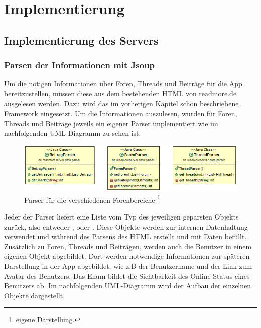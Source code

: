 \chapter{Implementierung}

\section{Implementierung des Servers}
\subsection{Parsen der Informationen mit Jsoup}
Um die nötigen Informationen über Foren, Threads und Beiträge für die App
bereitzustellen, müssen diese aus dem bestehenden HTML von readmore.de
ausgelesen werden. Dazu wird das im vorherigen Kapitel schon beschriebene
Framework  eingesetzt. Um die Informationen auszulesen,
wurden für Foren, Threads und Beiträge jeweils ein eigener Parser implementiert
wie im nachfolgenden UML-Diagramm zu sehen ist.
\begin{figure}[!htbp]
\centering
\includegraphics[width=\textwidth]{Bilder/Parser.png}
\caption[Parser für die verschiedenen Forenbereiche]{Parser für die verschiedenen Forenbereiche
 \protect\footnote{eigene Darstellung.} }
\label{dminfo}
\end{figure}
Jeder der Parser liefert eine Liste vom Typ des jeweiligen geparsten Objekts
zurück, also entweder ,  oder . Diese
Objekte werden zur internen Datenhaltung verwendet und während des Parsens des
HTML erstellt und mit Daten befüllt. Zusätzlich zu Foren, Threads und Beiträgen,
werden auch die Benutzer in einem eigenen Objekt abgebildet. Dort werden
notwendige Informationen zur späteren Darstellung in der App abgebildet, wie z.B
der Benutzername und der Link zum Avatar des Benutzers. Das Enum 
bildet die Sichtbarkeit des Online Status eines Benutzers ab. Im nachfolgenden
UML-Diagramm wird der Aufbau der einzelnen Objekte dargestellt.
